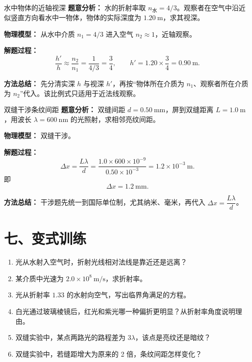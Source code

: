 \begin{examplebox}{水中物体的近轴视深}
\textbf{题意分析：} 水的折射率取 $n_{\text{水}}=4/3$。观察者在空气中沿近似竖直方向看水中一物体，物体的实际深度为 $1.20\ \mathrm{m}$，求其视深。

\textbf{物理模型：} 从水中介质 $n_1=4/3$ 进入空气 $n_2\approx1$，近轴观察。

\textbf{解题过程：}
\[
\frac{h'}{h}\approx\frac{n_2}{n_1}
=\frac{1}{4/3}=\frac34,
\qquad
h'=1.20\times\frac34=0.90\ \mathrm{m}.
\]

\textbf{方法总结：} 先分清实深 $h$ 与视深 $h'$，再按“物体所在介质为 $n_1$、观察者所在介质为 $n_2$”代入。该比例式只适用于近法线观察。
\end{examplebox}

\begin{examplebox}{双缝干涉条纹间距}
\textbf{题意分析：} 双缝间距 $d=0.50\ \mathrm{mm}$，屏到双缝距离 $L=1.0\ \mathrm{m}$，用波长 $\lambda=600\ \mathrm{nm}$ 的光照射，求相邻亮纹间距。

\textbf{物理模型：} 双缝干涉。

\begin{center}

\end{center}

\textbf{解题过程：}
\[
\Delta x=\frac{L\lambda}{d}
=\frac{1.0\times600\times10^{-9}}{0.50\times10^{-3}}
=1.2\times10^{-3}\ \mathrm{m}.
\]
即
\[
\Delta x=1.2\ \mathrm{mm}.
\]

\textbf{方法总结：} 干涉题先统一到国际单位制，尤其纳米、毫米，再代入 $\Delta x=\dfrac{L\lambda}{d}$。
\end{examplebox}

\section*{七、变式训练}

\begin{enumerate}
  \item 光从水射入空气时，折射光线相对法线是靠近还是远离？
  \item 某介质中光速为 $2.0\times10^8\ \mathrm{m/s}$，求折射率。
  \item 光从折射率 $1.33$ 的水射向空气，写出临界角满足的方程。
  \begin{center}
  
  \end{center}
  \item 白光通过玻璃棱镜后，红光和紫光哪一种偏折更明显？从折射率角度说明理由。
  \item 双缝实验中，某点两路光的路程差为 $3\lambda$，该点是亮纹还是暗纹？
  \item 双缝实验中，若缝距增大为原来的 2 倍，条纹间距怎样变化？
  \begin{center}
  
  \end{center}
\end{enumerate}

